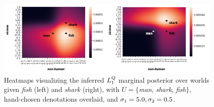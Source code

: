 \documentclass[OpenMind]{stjour}
\newcommand{\Listener}{L}
\newcommand{\QLONE}{\Listener_{{1}}^{{Q}}}
\begin{document}
	\begin{figure}

	\centering

	\includegraphics[width=\textwidth]{images/bothheatmaps.png}








	\caption{Heatmaps visualizing the inferred $\protect\QLONE$ marginal posterior over worlds given \emph{fish} (left) and \emph{shark} (right), with $U = \{$\emph{man}, \emph{shark}, \emph{fish}$\}$, hand-chosen denotations overlaid, and $\protect\sigma\protect_1=5.0, \protect\sigma\protect_2=0.5$.}


	\label{l1heatmaps}

	\end{figure}







\end{document}
